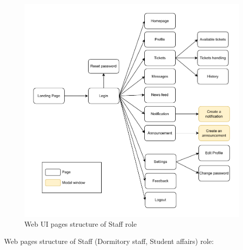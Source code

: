 	
	\begin{figure}[H]
		\centering
		\includegraphics[width=1\linewidth]{graphics/fe/ui-pages-staff.pdf}
		\caption{Web UI pages structure of Staff role}
		\label{fig:fe-ui-page-staff}
	\end{figure}
	
	Web pages structure of Staff (Dormitory staff, Student affairs) role:
	

